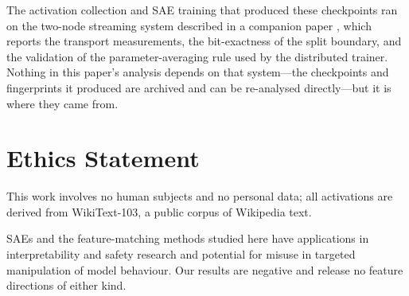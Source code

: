 \documentclass[11pt]{article}
\begin{document}
The activation collection and SAE training that produced these checkpoints ran on the
two-node streaming system described in a companion paper \citep{melton2026actstream},
which reports the transport measurements, the bit-exactness of the split boundary, and
the validation of the parameter-averaging rule used by the distributed trainer. Nothing
in this paper's analysis depends on that system---the checkpoints and fingerprints it
produced are archived and can be re-analysed directly---but it is where they came from.

\section*{Ethics Statement}

This work involves no human subjects and no personal data; all activations are derived
from WikiText-103, a public corpus of Wikipedia text.

SAEs and the feature-matching methods studied here have applications in interpretability
and safety research and potential for misuse in targeted manipulation of model behaviour.
Our results are negative and release no feature directions of either kind.



\end{document}
